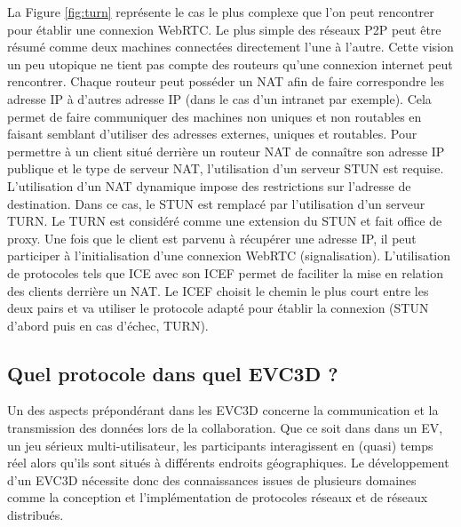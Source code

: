 La Figure \ref{fig:turn} représente le cas le plus complexe que l'on peut 
rencontrer pour établir une connexion WebRTC. Le plus simple des réseaux P2P 
peut être résumé comme deux machines connectées directement l'une à l'autre. 
Cette vision un peu utopique ne tient pas compte des routeurs qu'une connexion 
internet peut rencontrer. 
Chaque routeur peut posséder un \gls{NAT} afin de faire correspondre 
les adresse IP à d'autres adresse IP (dans le cas d'un intranet par exemple). 
Cela permet de faire communiquer des machines non uniques et non routables en 
faisant semblant d'utiliser des adresses externes, uniques et routables. 
Pour permettre à un client situé derrière un routeur \gls{NAT} de connaître son 
adresse IP publique et le type de serveur \gls{NAT}, l'utilisation d'un serveur 
\gls{STUN} est requise. 
L'utilisation d'un \gls{NAT} dynamique impose des restrictions sur l'adresse de  
destination. Dans ce cas, le \gls{STUN} est remplacé par l'utilisation d'un serveur 
\gls{TURN}. Le \gls{TURN} est considéré comme une extension du \gls{STUN} et fait office de 
proxy. 
Une fois que le client est parvenu à récupérer une adresse IP, il peut participer à 
l'initialisation d'une connexion WebRTC (signalisation). L'utilisation de protocoles 
tels que \gls{ICE} avec son \gls{ICEF} permet de faciliter la mise en relation des 
clients derrière un \gls{NAT}. Le \gls{ICEF} choisit le chemin le plus court entre les 
deux pairs et va utiliser le protocole adapté pour établir la connexion (\gls{STUN} 
d'abord puis en cas d'échec, \gls{TURN}).



\subsection{Quel protocole dans quel EVC3D ?}
Un des aspects prépondérant dans les \gls{EVC3D} concerne la communication et 
la transmission des données lors de la collaboration. Que ce soit dans dans un 
\gls{EV}, un jeu sérieux multi-utilisateur, les 
participants interagissent en (quasi) temps réel alors qu'ils sont situés à 
différents endroits géographiques. 
Le développement d'un \gls{EVC3D} nécessite donc des connaissances issues de 
plusieurs domaines comme la conception et l'implémentation de protocoles 
réseaux et de réseaux distribués.

